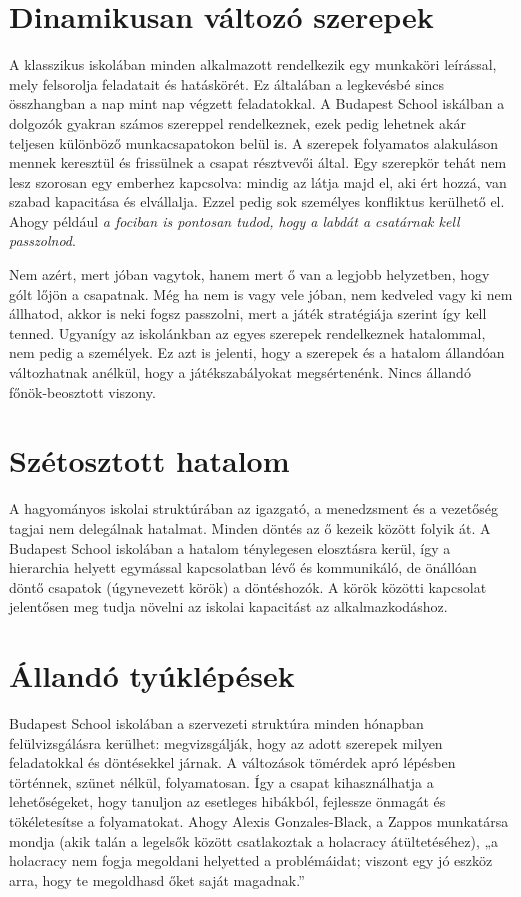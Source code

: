 \section{Dinamikusan változó szerepek}

A klasszikus iskolában minden alkalmazott rendelkezik egy munkaköri leírással, mely felsorolja feladatait és hatáskörét. Ez általában a legkevésbé sincs összhangban a nap mint nap végzett feladatokkal. A Budapest School iskálban a dolgozók gyakran számos szereppel rendelkeznek, ezek pedig lehetnek akár teljesen különböző munkacsapatokon belül is. A szerepek folyamatos alakuláson mennek keresztül és frissülnek a csapat résztvevői által. Egy szerepkör tehát nem lesz szorosan egy emberhez kapcsolva: mindig az látja majd el, aki ért hozzá, van szabad kapacitása és elvállalja. Ezzel pedig sok személyes konfliktus kerülhető el. Ahogy például
\emph{a fociban is pontosan tudod, hogy a labdát a csatárnak kell passzolnod}.

Nem azért, mert jóban vagytok, hanem mert ő van a legjobb helyzetben, hogy gólt lőjön a csapatnak. Még ha nem is vagy vele jóban, nem kedveled vagy ki nem állhatod, akkor is neki fogsz passzolni, mert a játék stratégiája szerint így kell tenned. Ugyanígy az iskolánkban az egyes szerepek rendelkeznek hatalommal, nem pedig a személyek. Ez azt is jelenti, hogy a szerepek és a hatalom állandóan változhatnak anélkül, hogy a játékszabályokat megsértenénk. Nincs állandó főnök-beosztott viszony.

\section{Szétosztott hatalom}

A hagyományos iskolai struktúrában az igazgató, a menedzsment és a vezetőség tagjai nem delegálnak hatalmat. Minden döntés az ő kezeik között folyik át. A Budapest School iskolában a hatalom ténylegesen elosztásra kerül, így a hierarchia helyett egymással kapcsolatban lévő és kommunikáló, de önállóan döntő csapatok (úgynevezett körök) a döntéshozók. A körök közötti kapcsolat jelentősen meg tudja növelni az iskolai kapacitást az alkalmazkodáshoz.

\section{Állandó tyúklépések}

Budapest School iskolában a szervezeti struktúra minden hónapban felülvizsgálásra kerülhet: megvizsgálják, hogy az adott szerepek milyen feladatokkal és döntésekkel járnak. A változások tömérdek apró lépésben történnek, szünet nélkül, folyamatosan. Így a csapat kihasználhatja a lehetőségeket, hogy tanuljon az esetleges hibákból, fejlessze önmagát és tökéletesítse a folyamatokat. Ahogy Alexis Gonzales-Black, a Zappos munkatársa mondja (akik talán a legelsők között csatlakoztak a holacracy átültetéséhez), „a holacracy nem fogja megoldani helyetted a problémáidat; viszont egy jó eszköz arra, hogy te megoldhasd őket saját magadnak.”

